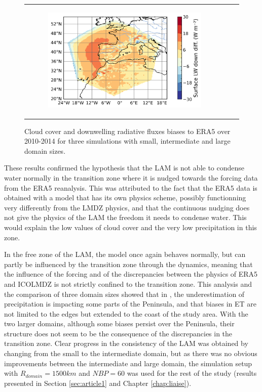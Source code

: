 \begin{figure}[htbp]
\begin{tabular}{ccc}
\begin{subfigure}[b]{0.33\textwidth}
            \includegraphics[width=\textwidth]{images/chap4/domain_size/diff_map_LWdnSFC_era_LAM_2000km_NBP80.png}
        \end{subfigure}
    \end{tabular}
    \caption{Cloud cover and downwelling radiative fluxes biases to ERA5 over 2010-2014 for three simulations with small, intermediate and large domain sizes.}
    \label{fig:domain_size_clouds_ERA_diff_maps}
\end{figure}

These results confirmed the hypothesis that the LAM is not able to condense water normally in the transition zone where it is nudged towards the forcing data from the ERA5 reanalysis. This was attributed to the fact that the ERA5 data is obtained with a model that has its own physics scheme, possibly functionning very differently from the LMDZ physics, and that the continuous nudging does not give the physics of the LAM the freedom it needs to condense water. This would explain the low values of cloud cover and the very low precipitation in this zone.

In the free zone of the LAM, the model once again behaves normally, but can partly be influenced by the transition zone through the dynamics, meaning that the influence of the forcing and of the discrepancies between the physics of ERA5 and ICOLMDZ is not strictly confined to the transition zone.
This analysis and the comparison of three domain sizes showed that in \smalld, the underestimation of precipitation is impacting some parts of the Peninsula, and that biases in ET are not limited to the edges but extended to the coast of the study area. With the two larger domains, although some biases persist over the Peninsula, their structure does not seem to be the consequence of the discrepancies in the transition zone. Clear progress in the consistency of the LAM was obtained by changing from the small to the intermediate domain, but as there was no obvious improvements between the intermediate and large domain, the \interd simulation setup with $R_{domain} = 1500 km$ and $NBP = 60$ was used for the rest of the study (results presented in Section \ref{sec:article1} and Chapter \ref{chap:liaise}).

